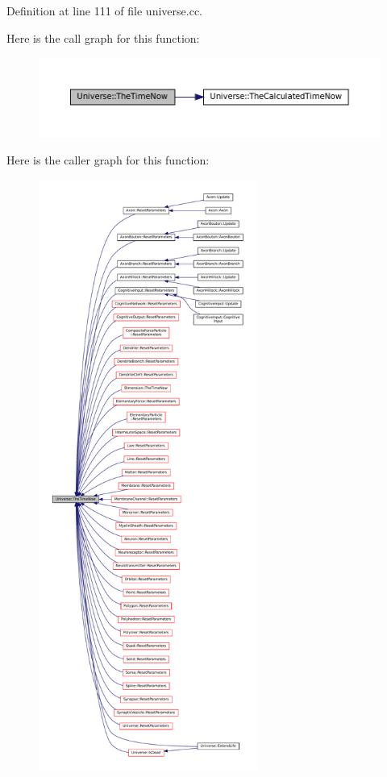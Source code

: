 Definition at line 111 of file universe.\+cc.

Here is the call graph for this function\+:\nopagebreak
\begin{figure}[H]
\begin{center}
\leavevmode
\includegraphics[width=350pt]{class_universe_ae54d34c5d695917e074b8e07e8820bdb_cgraph}
\end{center}
\end{figure}
Here is the caller graph for this function\+:\nopagebreak
\begin{figure}[H]
\begin{center}
\leavevmode
\includegraphics[height=550pt]{class_universe_ae54d34c5d695917e074b8e07e8820bdb_icgraph}
\end{center}
\end{figure}
\mbox{\label{class_universe_a64ee5a2c7e86c56fa426acb750438ce9}} 
